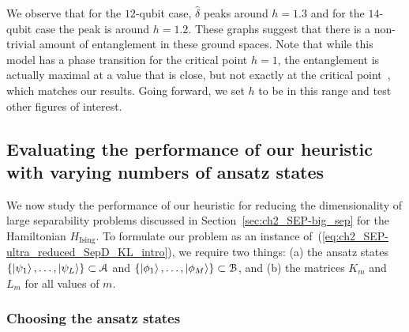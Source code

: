 We observe that for the $12$-qubit case, $\hat{\delta}$ peaks around $h = 1.3$ and for the $14$-qubit case the peak is around $h = 1.2$. 
These graphs suggest that there is a non-trivial amount of entanglement in these ground spaces. 
Note that while this model has a phase transition for the critical point $h=1$, the entanglement is actually maximal at a value that is close, but not exactly at the critical point~\cite{osterloh2002scaling}, which matches our results. 
Going forward, we set $h$ to be in this range and test other figures of interest.


\subsection{Evaluating the performance of our heuristic with varying numbers of ansatz states} \label{ss:ch2_SEP-vary_ansatz}

We now study the performance of our heuristic for reducing the dimensionality of large separability problems discussed in Section~\ref{sec:ch2_SEP-big_sep} for the Hamiltonian $H_{\mathrm{Ising}}$.
To formulate our problem as an instance of~(\ref{eq:ch2_SEP-ultra_reduced_SepD_KL_intro}), we require two things: (a) the ansatz states $\{\ket{\psi_1}, \dots, \ket{\psi_L}\} \subset \mathcal{A}$ and $\{\ket{\phi_1}, \dots, \ket{\phi_M}\} \subset \mathcal{B}$, and (b) the matrices $K_m$ and $L_m$ for all values of $m$.

\subsubsection{Choosing the ansatz states} 

